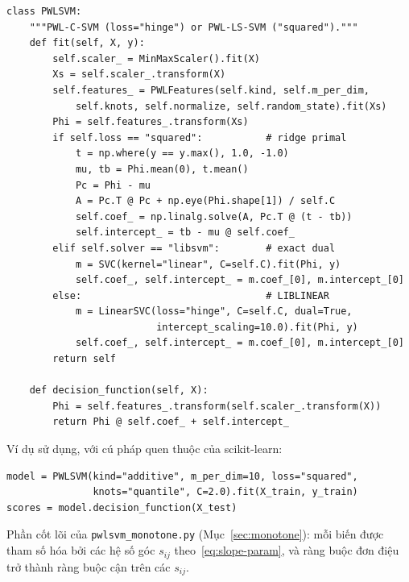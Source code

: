\begin{lstlisting}
class PWLSVM:
    """PWL-C-SVM (loss="hinge") or PWL-LS-SVM ("squared")."""
    def fit(self, X, y):
        self.scaler_ = MinMaxScaler().fit(X)
        Xs = self.scaler_.transform(X)
        self.features_ = PWLFeatures(self.kind, self.m_per_dim,
            self.knots, self.normalize, self.random_state).fit(Xs)
        Phi = self.features_.transform(Xs)
        if self.loss == "squared":           # ridge primal
            t = np.where(y == y.max(), 1.0, -1.0)
            mu, tb = Phi.mean(0), t.mean()
            Pc = Phi - mu
            A = Pc.T @ Pc + np.eye(Phi.shape[1]) / self.C
            self.coef_ = np.linalg.solve(A, Pc.T @ (t - tb))
            self.intercept_ = tb - mu @ self.coef_
        elif self.solver == "libsvm":        # exact dual
            m = SVC(kernel="linear", C=self.C).fit(Phi, y)
            self.coef_, self.intercept_ = m.coef_[0], m.intercept_[0]
        else:                                # LIBLINEAR
            m = LinearSVC(loss="hinge", C=self.C, dual=True,
                          intercept_scaling=10.0).fit(Phi, y)
            self.coef_, self.intercept_ = m.coef_[0], m.intercept_[0]
        return self

    def decision_function(self, X):
        Phi = self.features_.transform(self.scaler_.transform(X))
        return Phi @ self.coef_ + self.intercept_
\end{lstlisting}

\noindent Ví dụ sử dụng, với cú pháp quen thuộc của scikit-learn:

\begin{lstlisting}
model = PWLSVM(kind="additive", m_per_dim=10, loss="squared",
               knots="quantile", C=2.0).fit(X_train, y_train)
scores = model.decision_function(X_test)
\end{lstlisting}

\noindent Phần cốt lõi của \texttt{pwlsvm\_monotone.py} (Mục~\ref{sec:monotone}): mỗi biến được tham số hóa bởi các hệ số góc $s_{ij}$ theo~\eqref{eq:slope-param}, và ràng buộc đơn điệu trở thành ràng buộc cận trên các $s_{ij}$.

